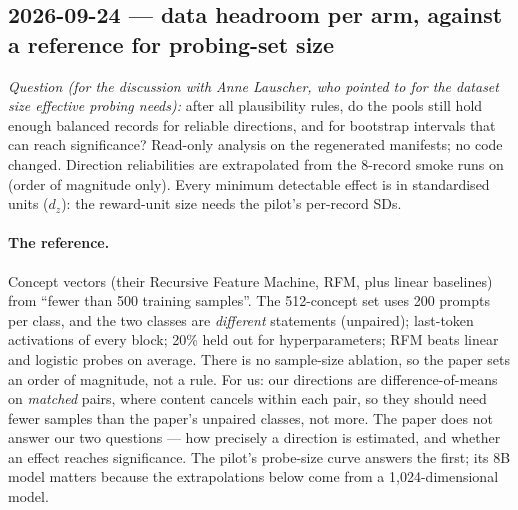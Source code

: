 \documentclass{article}
\begin{document}
\subsection*{2026-09-24 --- data headroom per arm, against a reference for probing-set size}
\emph{Question (for the discussion with Anne Lauscher, who pointed to \citet{beaglehole2025universal} for the dataset
size effective probing needs):} after all plausibility rules, do the pools still hold enough balanced records for
reliable directions, and for bootstrap intervals that can reach significance? Read-only analysis on the regenerated
manifests; no code changed. Direction reliabilities are extrapolated from the 8-record smoke runs on \modelSmall{}
(order of magnitude only). Every minimum detectable effect is in standardised units ($d_z$): the reward-unit size
needs the pilot's per-record SDs.

\paragraph{The reference.} Concept vectors (their Recursive Feature Machine, RFM, plus linear baselines) from ``fewer
than 500 training samples''. The 512-concept set uses 200 prompts per class, and the two classes are
\emph{different} statements (unpaired); last-token activations of every block; 20\% held out for hyperparameters;
RFM beats linear and logistic probes on average. There is no sample-size ablation, so the paper sets an order of
magnitude, not a rule. For us: our directions are difference-of-means on \emph{matched} pairs, where content
cancels within each pair, so they should need fewer samples than the paper's unpaired classes, not more. The paper
does not answer our two questions --- how precisely a direction is estimated, and whether an effect reaches
significance. The pilot's probe-size curve answers the first; its 8B model matters because the extrapolations
below come from a 1{,}024-dimensional model.
\end{document}
